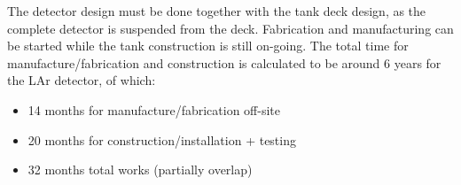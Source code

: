 The detector design must be done together with the tank deck design, as the complete detector is suspended from the deck.  Fabrication and manufacturing can be started while the tank construction is still on-going.  The total time for manufacture/fabrication and construction is calculated to be around 6 years for the LAr detector, of which:

\begin{itemize}
\item{14 months		for manufacture/fabrication off-site}
\item{20 months		for construction/installation + testing}
\item{32 months		total works (partially overlap)}
\end{itemize}
